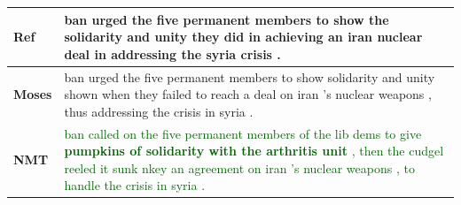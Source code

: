 \documentclass[landscape]{jhuslides3C}
\begin{document}
\vspace{10mm}
\begin{center}
\begin{tabular}{|p{3cm}|p{20cm}|}
\textbf{Ref} & ban urged the five permanent members to show the solidarity and unity they did in achieving an iran nuclear deal in addressing the syria crisis .\\[1cm] \hline \hline
\textbf{Moses} & \textcolor{verydarkorange}{ban urged the five permanent members to show solidarity and unity shown when they failed to reach a deal on iran 's nuclear weapons , thus addressing the crisis in syria .} \\[1cm] \hline \hline
\textbf{NMT} & \textcolor{darkgreen}{ban called on the five permanent members of the lib dems to give \textbf{pumpkins of solidarity with the arthritis unit} , then the cudgel reeled it sunk nkey an agreement on iran 's nuclear weapons , to handle the crisis in syria .}
\end{tabular}
\end{center}
\end{document}
